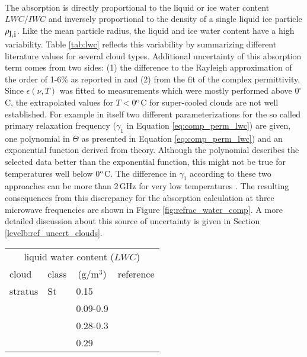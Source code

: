 {\begin{eqnarray}
\end{eqnarray}
%
The absorption is directly proportional to the liquid or ice water
content $LWC/IWC$ and inversely proportional to the density of a
single liquid ice particle $\rho_{\mbox{\rm l,i}}$. Like the mean particle radius,
the liquid and ice water content have a high variability. Table
\ref{tab:lwc} reflects this variability by summarizing different
literature values for several cloud types. Additional uncertainty 
of this absorption term comes from two sides: 
(1) the difference to the Rayleigh approximation
of the order of 1-6\% as reported in \citet{lietal:97} and (2) from
the fit of the complex permittivity.  Since $\epsilon(\nu,T)$ was
fitted to measurements which were mostly performed above $0^\circ$C,
the extrapolated values for $T<$0$^{\rm o}$C for super-cooled
clouds are not well established. For example in \cite{liebeetal:91} 
itself two different parameterizations for the so called primary 
relaxation frequency ($\gamma_1$ in Equation \ref{eq:comp_perm_lwc}) 
are given, one polynomial in $\Theta$ as presented in 
Equation \ref{eq:comp_perm_lwc}) and an exponential function derived
from theory. Although the polynomial describes the selected 
data better than the exponential function, this might not be true for
temperatures well below 0$^{\rm o}$C.
The difference in $\gamma_1$ according to these two approaches can 
be more than 2\,GHz for very low temperatures \citep{liptonetal:99}. 
The resulting consequences from this discrepancy for the absorption 
calculation at three microwave frequencies are shown in 
Figure \ref{fig:refrac_water_comp}. A more detailed
discussion about this source of uncertainty is given in Section
\ref{levelb:ref_uncert_clouds}.
%
\begin{table}[!htb]
\begin{center}
\begin{tabular}{llll}
\hline
\multicolumn{4}{c}{liquid water content ($LWC$)} \\
 cloud        & class & \multicolumn{1}{c}{(g/m$^3$)} & reference\\
\hline
 stratus      & St    & 0.15        & \cite{salby:96}\\
              &       & 0.09-0.9    & \cite{seinfeld:98}\\
              &       & 0.28-0.3    & \cite{hess:98}\\
              &       & 0.29        & \cite{abreu:96}\\

\end{tabular}
\end{center}
\end{table}}
